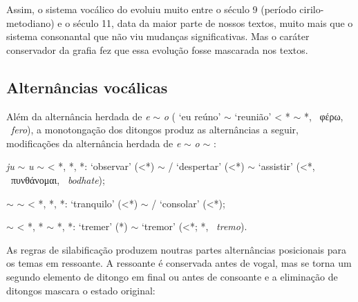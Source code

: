 Assim, o sistema vocálico do  evoluiu muito entre o século 9
(período cirilo-metodiano) e o século 11, data da maior parte de nossos textos,
muito mais que o sistema consonantal que não viu mudanças significativas. Mas o
caráter conservador da grafia fez que essa evolução fosse mascarada nos textos.

\subsection{Alternâncias vocálicas}

Além da alternância herdada de \emph{e} $\sim$ \emph{o}
( `eu reúno' $\sim$
 `reunião' < *
$\sim$ *, ~φέρω,
~\emph{fero}), a monotongação dos ditongos produz as
alternâncias a seguir, modificações da alternância herdada de \emph{e} $\sim$
\emph{o} $\sim$ \emptyfon{}:

\begin{compactitem}[--]
	\item \emph{ju} $\sim$ \emph{u} $\sim$  < *,
	*, *:
	 `observar'
	(<*) $\sim$ \slash{}
	`despertar' (<*) $\sim$
	 `assistir' (<*,
	~πυνθάνομαι, ~\emph{bodhate});
	\item {} $\sim$  $\sim$  < *,
	*, *:  `tranquilo'
	(<*) $\sim$ \slash{}
	`consolar' (<*);
	\item {} $\sim$  < *, * $\sim$
	*, *:  `tremer'
	(*) $\sim$  `tremor'
	(<*; *, ~\emph{tremo}).
\end{compactitem}

As regras de silabificação produzem noutras partes alternâncias posicionais para
os temas em ressoante.
A ressoante é conservada antes de vogal, mas se torna um segundo elemento de
ditongo em final ou antes de consoante e a eliminação de ditongos mascara o
estado original:

